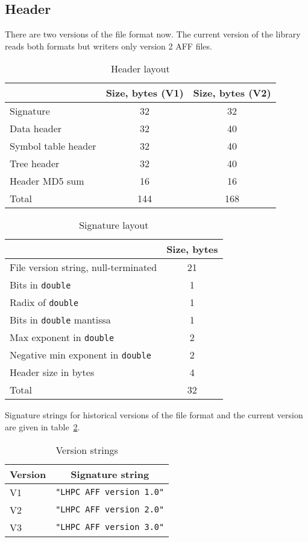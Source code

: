 \documentclass[10pt,letterpaper]{article}
\newcommand{\bc}{\begin{center}}
\newcommand{\ec}{\end{center}}
\newcommand{\ctext}[1]{\texttt{#1}}         %
\begin{document}
\subsection{Header}
There are two versions of the file format now. The current version of the
library reads both formats but writers only version 2 AFF files.
\begin{table}[h]
\bc
\caption{Header layout}\label{tab:header}
\begin{tabular}{|l|c|c|} \hline
 & Size, bytes (V1) & Size, bytes (V2)\\ \hline\hline
Signature & 32 & 32 \\ \hline
Data header & 32 & 40 \\ \hline
Symbol table header & 32 & 40 \\ \hline
Tree header & 32 & 40 \\ \hline
Header MD5 sum & 16 & 16 \\ \hline\hline
Total & 144 & 168 \\ \hline
\end{tabular}
\ec
\end{table}

\begin{table}[h]
\bc
\caption{Signature layout}\label{tab:signature}
\begin{tabular}{|l|c|} \hline
 & Size, bytes \\ \hline\hline
File version string, null-terminated &  21\\ \hline
Bits in \ctext{double} & 1 \\ \hline
Radix of \ctext{double} & 1 \\ \hline
Bits in \ctext{double} mantissa & 1 \\ \hline
Max exponent in \ctext{double} & 2 \\ \hline
Negative min exponent in \ctext{double} & 2 \\ \hline
Header size in bytes & 4 \\ \hline\hline
Total & 32 \\ \hline
\end{tabular}
\ec
\end{table}
Signature strings for historical versions of the file format and the
current version are given in table~\ref{tab:signature}.
\begin{table}[h]
\bc
\caption{Version strings}\label{tab:versions}
\begin{tabular}{|l|c|} \hline
 Version & Signature string \\ \hline\hline
 V1 & \verb|"LHPC AFF version 1.0"| \\ \hline
 V2 & \verb|"LHPC AFF version 2.0"| \\ \hline
 V3 & \verb|"LHPC AFF version 3.0"| \\ \hline
\end{tabular}
\ec
\end{table}
\end{document}
